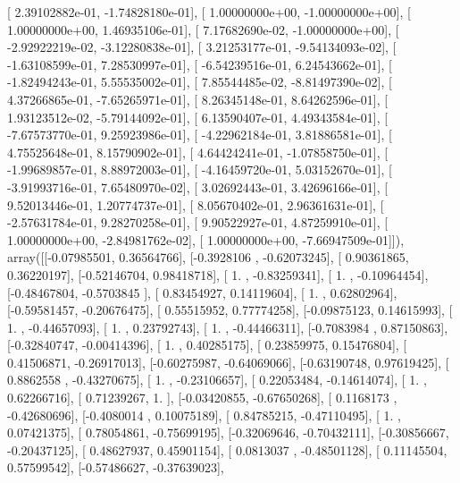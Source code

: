 \documentclass{article}
\begin{document}
       [  2.39102882e-01,  -1.74828180e-01],
       [  1.00000000e+00,  -1.00000000e+00],
       [  1.00000000e+00,   1.46935106e-01],
       [  7.17682690e-02,  -1.00000000e+00],
       [ -2.92922219e-02,  -3.12280838e-01],
       [  3.21253177e-01,  -9.54134093e-02],
       [ -1.63108599e-01,   7.28530997e-01],
       [ -6.54239516e-01,   6.24543662e-01],
       [ -1.82494243e-01,   5.55535002e-01],
       [  7.85544485e-02,  -8.81497390e-02],
       [  4.37266865e-01,  -7.65265971e-01],
       [  8.26345148e-01,   8.64262596e-01],
       [  1.93123512e-02,  -5.79144092e-01],
       [  6.13590407e-01,   4.49343584e-01],
       [ -7.67573770e-01,   9.25923986e-01],
       [ -4.22962184e-01,   3.81886581e-01],
       [  4.75525648e-01,   8.15790902e-01],
       [  4.64424241e-01,  -1.07858750e-01],
       [ -1.99689857e-01,   8.88972003e-01],
       [ -4.16459720e-01,   5.03152670e-01],
       [ -3.91993716e-01,   7.65480970e-02],
       [  3.02692443e-01,   3.42696166e-01],
       [  9.52013446e-01,   1.20774737e-01],
       [  8.05670402e-01,   2.96361631e-01],
       [ -2.57631784e-01,   9.28270258e-01],
       [  9.90522927e-01,   4.87259910e-01],
       [  1.00000000e+00,  -2.84981762e-02],
       [  1.00000000e+00,  -7.66947509e-01]]), array([[-0.07985501,  0.36564766],
       [-0.3928106 , -0.62073245],
       [ 0.90361865,  0.36220197],
       [-0.52146704,  0.98418718],
       [ 1.        , -0.83259341],
       [ 1.        , -0.10964454],
       [-0.48467804, -0.5703845 ],
       [ 0.83454927,  0.14119604],
       [ 1.        ,  0.62802964],
       [-0.59581457, -0.20676475],
       [ 0.55515952,  0.77774258],
       [-0.09875123,  0.14615993],
       [ 1.        , -0.44657093],
       [ 1.        ,  0.23792743],
       [ 1.        , -0.44466311],
       [-0.7083984 ,  0.87150863],
       [-0.32840747, -0.00414396],
       [ 1.        ,  0.40285175],
       [ 0.23859975,  0.15476804],
       [ 0.41506871, -0.26917013],
       [-0.60275987, -0.64069066],
       [-0.63190748,  0.97619425],
       [ 0.8862558 , -0.43270675],
       [ 1.        , -0.23106657],
       [ 0.22053484, -0.14614074],
       [ 1.        ,  0.62266716],
       [ 0.71239267,  1.        ],
       [-0.03420855, -0.67650268],
       [ 0.1168173 , -0.42680696],
       [-0.4080014 ,  0.10075189],
       [ 0.84785215, -0.47110495],
       [ 1.        ,  0.07421375],
       [ 0.78054861, -0.75699195],
       [-0.32069646, -0.70432111],
       [-0.30856667, -0.20437125],
       [ 0.48627937,  0.45901154],
       [ 0.0813037 , -0.48501128],
       [ 0.11145504,  0.57599542],
       [-0.57486627, -0.37639023],
\end{document}
